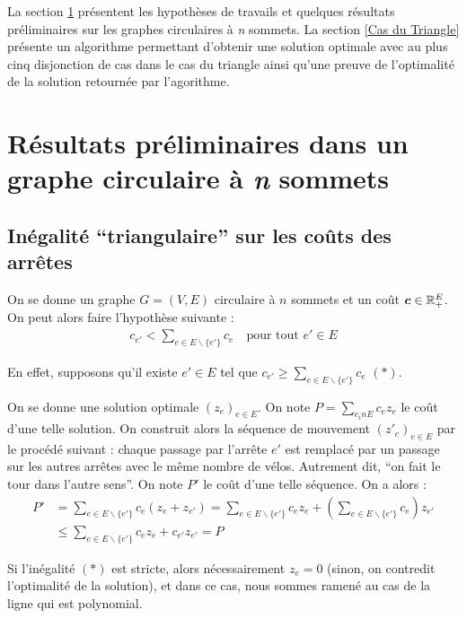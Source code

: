 \documentclass[twoside,11pt,openany,a4paper]{rapport}
\begin{document}
La section \ref{Résultats préliminaires} présentent les hypothèses de travails et quelques résultats préliminaires sur les graphes circulaires à \emph{n} sommets. La section \ref{Cas du Triangle} présente un algorithme permettant d'obtenir une solution optimale avec au plus cinq disjonction de cas dans le cas du triangle ainsi qu'une preuve de l'optimalité de la solution retournée par l'agorithme.

\chapter{Résultats préliminaires dans un graphe circulaire à \textit{n} sommets}
\label{Résultats préliminaires}

\section{Inégalité ``triangulaire'' sur les coûts des arrêtes}
\label{sec: Inégalité triangulaire}

On se donne un graphe $G=(V,E)$ circulaire à $n$ sommets et un coût $\boldsymbol{c} \in \mathbb{R}^E_+$. On peut alors faire l'hypothèse suivante :
\begin{gather}\label{Inégalité Triangulaire}
  c_{e'}<\sum_{e \in E \backslash \{e'\}} c_e \quad \text{pour tout } e' \in E
\end{gather}

En effet, supposons qu'il existe $e' \in E$ tel que $c_{e'} \ge \sum_{e \in E \backslash \{e'\}} c_e$ $(*)$.

On se donne une solution optimale $(z_e)_{e \in E}$. On note $P = \sum_{e _in E} c_ez_e$ le coût d'une telle solution. On construit alors la séquence de mouvement $(z'_e)_{e \in E}$ par le procédé suivant : chaque passage par l'arrête $e'$ est remplacé par un passage sur les autres arrêtes avec le même nombre de vélos. Autrement dit, ``on fait le tour dans l'autre sens''. On note $P'$ le coût d'une telle séquence. On a alors :
\begin{align*}
  P' &= \sum_{e \in E \backslash \{e'\}} c_e (z_e + z_{e'}) = \sum_{e \in E \backslash \{e'\}} c_ez_e + \left(\sum_{e \in E \backslash \{e'\}} c_{e}\right)z_{e'} \\
     &\le \sum_{e \in E \backslash \{e'\}} c_ez_e + c_{e'}z_{e'} = P
\end{align*}

Si l'inégalité $(*)$ est stricte, alors nécessairement $z_e = 0$ (sinon, on contredit l'optimalité de la solution), et dans ce cas, nous sommes ramené au cas de la ligne qui est polynomial.
\end{document}
